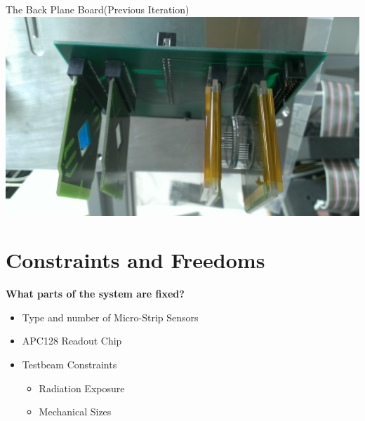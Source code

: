 \documentclass{beamer}
\begin{document}
\begin{frame}{The Back Plane Board(Previous Iteration)}
  \centering
  \includegraphics[width=1.0\textwidth]{figures/BPB_Prev}
\end{frame}


\section{Constraints and Freedoms}
\begin{frame}
  \textbf{What parts of the system are fixed?}
  \begin{itemize}
    \item Type and number of Micro-Strip Sensors
    \item APC128 Readout Chip
    \item Testbeam Constraints
      \begin{itemize}
        \item Radiation Exposure
        \item Mechanical Sizes
      \end{itemize}
  \end{itemize}
\end{frame}
\end{document}
